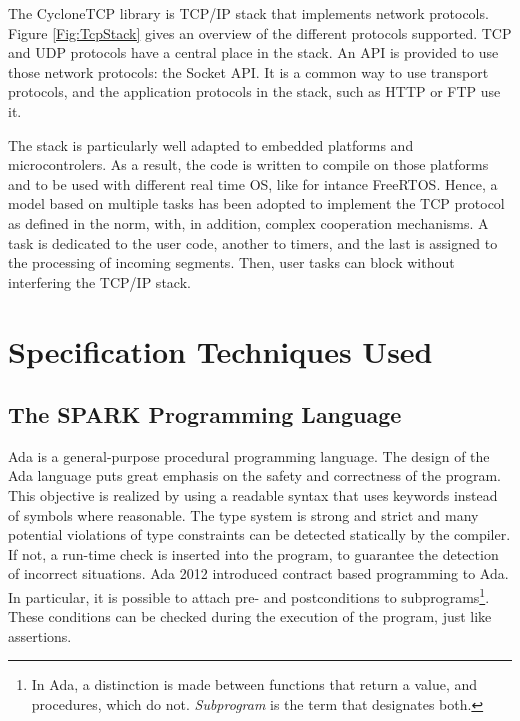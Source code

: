 \documentclass[runningheads]{llncs}
\begin{document}
    The CycloneTCP library is TCP/IP stack that implements network protocols. 
    Figure \ref{Fig:TcpStack} gives an overview of the different protocols supported. TCP and UDP protocols have a central place
    in the stack. An API is provided to use those network protocols: the Socket API. It is a common way to use transport protocols,
    and the application protocols in the stack, such as HTTP or FTP use it.

    The stack is particularly well adapted to embedded platforms and microcontrolers. As a result, the code is written
    to compile on those platforms and to be used with different real time OS, like for intance FreeRTOS.
    Hence, a model based on multiple tasks has been adopted to implement the TCP protocol as defined in the norm, with,
    in addition, complex cooperation mechanisms. A task is dedicated to the user code, another to timers, and the last is
    assigned to the processing of incoming segments. Then, user tasks can block without interfering the TCP/IP stack.

\section{Specification Techniques Used}

\subsection{The SPARK Programming Language}

Ada is a general-purpose procedural programming language. The design of the Ada
language puts great emphasis on the safety and correctness of the program. This
objective is realized by using a readable syntax that uses keywords instead of
symbols where reasonable. The type system is strong and strict and many
potential violations of type constraints can be detected statically by the
compiler. If not, a run-time check is inserted into the program, to guarantee
the detection of incorrect situations. Ada 2012 introduced contract based
programming to Ada. In particular, it is possible to attach pre- and
postconditions to subprograms\footnote{In Ada, a distinction is made between
  functions that return a value, and procedures, which do
  not. \emph{Subprogram} is the term that designates both.}.  These conditions
can be checked during the execution of the program, just like assertions.
\end{document}
